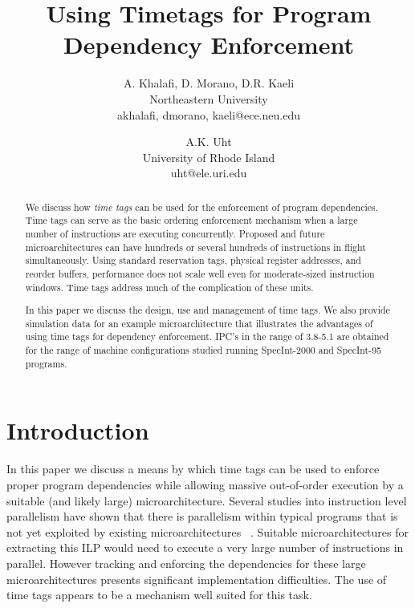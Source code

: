 \documentclass[10pt,twocolumn]{article}
\begin{document}
%
\parskip 1mm
%
%
\title{Using Timetags for Program Dependency Enforcement}
%
\author{
A. Khalafi, D. Morano, D.R. Kaeli\\
Northeastern University\\
{akhalafi, dmorano, kaeli}@ece.neu.edu\\
\and
A.K. Uht\\
University of Rhode Island\\ 
uht@ele.uri.edu
}
%
%
\date{}
%
\maketitle
%
%
%
\begin{abstract}
We discuss how {\em time tags} can be used for the enforcement of
program dependencies.
Time tags can serve as the basic ordering enforcement mechanism
when a large number of instructions are executing concurrently.
Proposed and future microarchitectures can have hundreds or several hundreds
of instructions in flight simultaneously. Using standard 
reservation
tags, physical register addresses, and reorder buffers,
performance does not scale
well even for moderate-sized instruction windows.
Time tags address much of the complication of these units.

In this paper we discuss the
design, use and management of time tags.
We also provide simulation data for an example microarchitecture
that illustrates the
advantages of using time tags for dependency enforcement.  IPC's
in the range of 3.8-5.1 are obtained for the
range of machine configurations studied running SpecInt-2000 and
SpecInt-95 programs. 
\end{abstract}
%
%
\vspace{-0.25in}
\section{Introduction}
\vspace{-0.15in}
%
In this paper we discuss a means by which time tags can be used
to enforce proper program dependencies while allowing
massive out-of-order execution by a suitable (and likely large)
microarchitecture.
Several studies into instruction level parallelism
have shown that there is parallelism within
typical programs that is not yet exploited by existing
microarchitectures ~\cite{Gon97,Lam92,Uht95}.  
Suitable microarchitectures for extracting this ILP would need to
execute a very large number of instructions in parallel.
However tracking and enforcing the dependencies for these
large microarchitectures presents significant implementation
difficulties.  The use of time tags appears to be a mechanism well suited
for this task.
\end{document}
